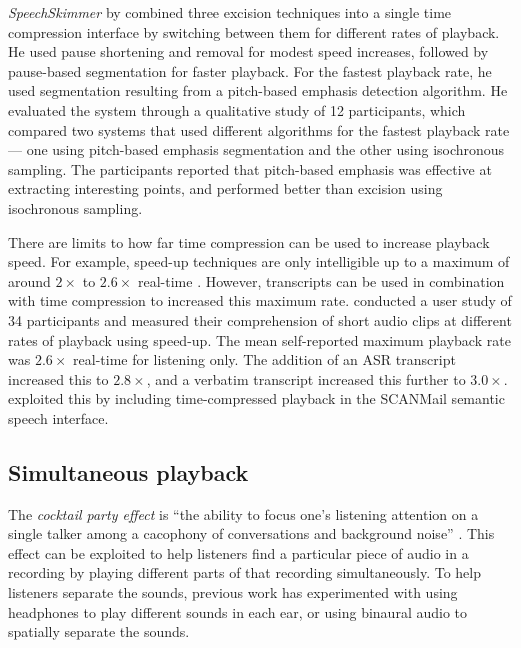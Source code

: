 \textit{SpeechSkimmer} by \citet{Arons1997} combined three excision techniques into a single time compression interface
by switching between them for different rates of playback. He used pause shortening and removal for modest speed
increases, followed by pause-based segmentation for faster playback. For the fastest playback rate, he used segmentation
resulting from a pitch-based emphasis detection algorithm. He evaluated the system through a qualitative study of 12
participants, which compared two systems that used different algorithms for the fastest playback rate --- one using
pitch-based emphasis segmentation and the other using isochronous sampling. The participants reported that pitch-based
emphasis was effective at extracting interesting points, and performed better than excision using isochronous sampling.

There are limits to how far time compression can be used to increase playback speed.  For example, speed-up techniques
are only intelligible up to a maximum of around $2\times$ to $2.6\times$ real-time
\citep{Vemuri2004,Tucker2006,Ranjan2006,Arons1997}.  However, transcripts can be used in combination with time
compression to increased this maximum rate.  \citet{Vemuri2004} conducted a user study of 34 participants and measured
their comprehension of short audio clips at different rates of playback using speed-up. The mean self-reported maximum
playback rate was $2.6\times$ real-time for listening only. The addition of an ASR transcript increased this to
$2.8\times$, and a verbatim transcript increased this further to $3.0\times$. \citet{Whittaker2002} exploited this by
including time-compressed playback in the SCANMail semantic speech interface.



\subsection{Simultaneous playback}

The \textit{cocktail party effect} is ``the ability to focus one's listening attention on a single talker among a
cacophony of conversations and background noise'' \citep{Arons1992}.  This effect can be exploited to help listeners
find a particular piece of audio in a recording by playing different parts of that recording simultaneously. To help
listeners separate the sounds, previous work has experimented with using headphones to play different sounds in each
ear, or using binaural audio to spatially separate the sounds. 

